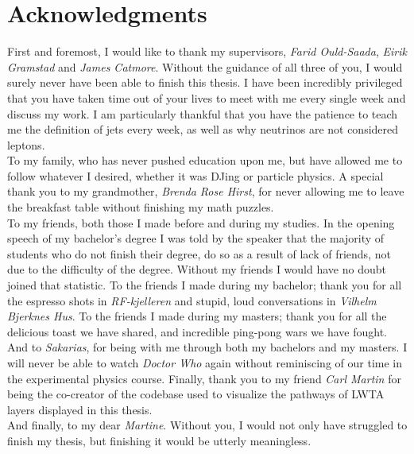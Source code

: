 \chapter*{Acknowledgments}
First and foremost, I would like to thank my supervisors, \emph{Farid Ould-Saada}, \emph{Eirik Gramstad} and \emph{James Catmore}. 
Without the guidance of all three of you, I would surely never have been able to finish this thesis. I have been incredibly
privileged that you have taken time out of your lives to meet with me every single week and discuss my work. 
I am particularly thankful that you have the patience to teach me the definition of jets every week, as well as
why neutrinos are not considered leptons.
\\\newline
To my family, who has never pushed education upon me, but have allowed me to follow whatever I desired, whether it was DJing or 
particle physics. A special thank you to my grandmother, \emph{Brenda Rose Hirst}, for never allowing me to leave the breakfast table 
without finishing my math puzzles.
\\\newline
To my friends, both those I made before and during my studies. In the opening speech of my bachelor's degree I was told by the speaker that 
the majority of students who do not finish their degree, do so as a result of lack of friends, not due to the difficulty of the degree.
Without my friends I would have no doubt joined that statistic. To the friends I made during my bachelor; thank you for all the espresso shots in \emph{RF-kjelleren}
and stupid, loud conversations in \emph{Vilhelm Bjerknes Hus}. To the friends I made during my masters; thank you for all the delicious toast we have shared, and 
incredible ping-pong wars we have fought. And to \emph{Sakarias}, for being with me through both my bachelors and my masters. I will never be able 
to watch \emph{Doctor Who} again without reminiscing of our time in the experimental physics course. Finally, thank you to my friend \emph{Carl Martin} 
for being the co-creator of the codebase used to visualize the pathways of \acs{LWTA} layers displayed in this thesis. 
\\\newline
And finally, to my dear \emph{Martine}. Without you, I would not only have struggled to finish my thesis, but finishing it would be utterly 
meaningless.
